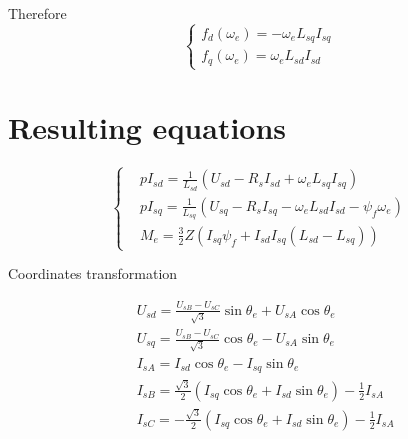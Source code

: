 \documentclass[11pt,a4paper,oneside]{report}
\begin{document}
Therefore
\begin{equation}
	\left\{
	\begin{split}
		f_d(\omega_e) = -\omega_eL_{sq}I_{sq}\\
		f_q(\omega_e) = \omega_eL_{sd}I_{sd}
	\end{split}
	\right.
\end{equation}

\section{Resulting equations}

\begin{equation}
	\left\{
	\begin{split}
		& pI_{sd}=\frac{1}{L_{sd}}(U_{sd}-R_sI_{sd}+\omega_eL_{sq}I_{sq})\\
		& pI_{sq} = \frac{1}{L_{sq}}(U_{sq}-R_sI_{sq}-\omega_eL_{sd}I_{sd}-\psi_f\omega_e)\\
		& M_e = \frac{3}{2}Z(I_{sq}\psi_f+I_{sd}I_{sq}(L_{sd}-L_{sq}))
	\end{split}
	\right.
\end{equation}

Coordinates transformation

\begin{equation}
	\begin{split}
		& U_{sd} = \frac{U_{sB}-U_{sC}}{\sqrt{3}}\sin\theta_e+U_{sA}\cos\theta_e\\
		& U_{sq} = \frac{U_{sB}-U_{sC}}{\sqrt{3}}\cos\theta_e-U_{sA}\sin\theta_e\\
		& I_{sA} = I_{sd}\cos\theta_e-I_{sq}\sin\theta_e\\
		& I_{sB} = \frac{\sqrt{3}}{2}(I_{sq}\cos\theta_e+I_{sd}\sin\theta_e)-\frac{1}{2}I_{sA}\\
		& I_{sC} = -\frac{\sqrt{3}}{2}(I_{sq}\cos\theta_e+I_{sd}\sin\theta_e)-\frac{1}{2}I_{sA}
	\end{split}
\end{equation}

	
\end{document}
